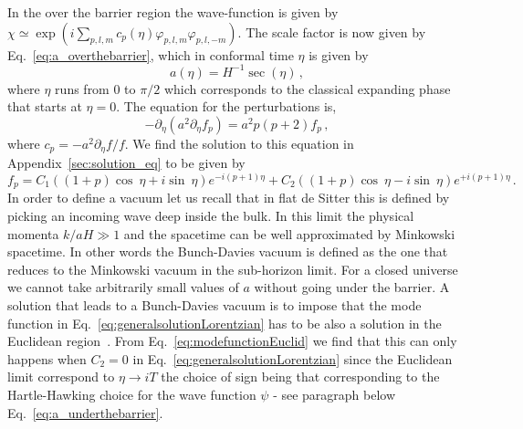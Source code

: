 \documentclass[a4paper,11pt]{article}
\numberwithin{equation}{section}
\numberwithin{equation}{section}
\begin{document}
In the over the barrier region the wave-function is given by $\chi \simeq\exp(i\sum_{p, l, m}c_p(\eta)\varphi_{p, l, m}\varphi_{p, l, -m})$. The scale factor is now given by Eq.~\eqref{eq:a_overthebarrier}, which in conformal time $\eta$ is given by
\begin{equation}
\label{eq:LorentzianScaleFactor}
a(\eta)=H^{-1}\sec(\eta) \,,
\end{equation}
where $\eta$ runs from $0$ to $\pi/2$ which corresponds to the classical  expanding phase that starts  at $\eta=0$. The equation for the perturbations is,
\begin{equation}
-\partial_\eta(a^2\partial_\eta f_p)=a^2p(p+2)f_p \,, \label{eq:Lorentizanequation}
\end{equation}
where  $c_p=- a^2\partial_\eta f/f$. We find the solution to this equation in Appendix~\ref{sec:solution_eq} to be  given by
\begin{equation}
f_p=C_1((1+p)\cos\ \eta+i\sin\ \eta )e^{-i(p+1)\eta}+C_2 ((1+p)\cos\ \eta-i\sin\ \eta )e^{+i(p+1)\eta} \,.
\label{eq:generalsolutionLorentzian}
\end{equation}
In order to define a vacuum let us recall that in flat de Sitter this is defined by picking an incoming wave  deep inside the bulk. In this limit the physical momenta $k/aH\gg 1$ and the spacetime can be well approximated by Minkowski spacetime. In other words the Bunch-Davies vacuum is defined as the one that reduces to the Minkowski vacuum in the sub-horizon limit. For a closed universe we cannot take arbitrarily small values of $a$ without going under the barrier. A solution that leads to a Bunch-Davies vacuum  is to impose that the mode function in Eq.~\eqref{eq:generalsolutionLorentzian} has to be also a solution in the Euclidean region~\cite{Laflamme:1987mx}. From Eq.~\eqref{eq:modefunctionEuclid} we find that this can only happens when $C_2=0$ in Eq.~\eqref{eq:generalsolutionLorentzian} since the Euclidean limit correspond to $\eta\to iT$ the choice of sign being that corresponding to the Hartle-Hawking choice for the wave function $\psi$ - see paragraph below Eq.~\eqref{eq:a_underthebarrier}.\\
\end{document}
